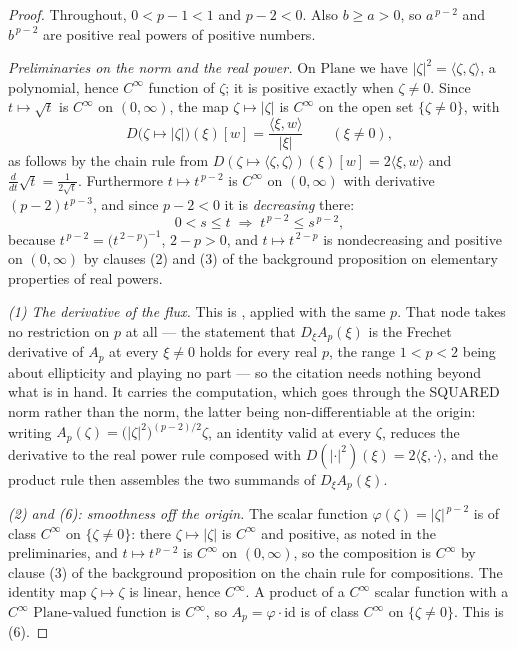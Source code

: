 \begin{proof}
Throughout, $0<p-1<1$ and $p-2<0$.  Also $b\ge a>0$, so $a^{\,p-2}$ and $b^{\,p-2}$ are
positive real powers of positive numbers.

\medskip\noindent\emph{Preliminaries on the norm and the real power.}
On $\mathrm{Plane}$ we have $\lvert\zeta\rvert^{2}=\langle\zeta,\zeta\rangle$, a polynomial,
hence $C^{\infty}$ function of $\zeta$; it is positive exactly when $\zeta\ne0$.  Since
$t\mapsto\sqrt{t}$ is $C^{\infty}$ on $(0,\infty)$, the map $\zeta\mapsto\lvert\zeta\rvert$ is
$C^{\infty}$ on the open set $\{\zeta\ne0\}$, with
\[
  D\bigl(\zeta\mapsto\lvert\zeta\rvert\bigr)(\xi)[w]
  =\frac{\langle\xi,w\rangle}{\lvert\xi\rvert}\qquad(\xi\ne0),
\]
as follows by the chain rule from $D(\zeta\mapsto\langle\zeta,\zeta\rangle)(\xi)[w]
=2\langle\xi,w\rangle$ and $\frac{d}{dt}\sqrt{t}=\frac{1}{2\sqrt t}$.  Furthermore
$t\mapsto t^{\,p-2}$ is $C^{\infty}$ on $(0,\infty)$ with derivative $(p-2)t^{\,p-3}$, and
since $p-2<0$ it is \emph{decreasing} there:
\begin{equation}\label{eq:fje-mono}
  0<s\le t\;\Longrightarrow\;t^{\,p-2}\le s^{\,p-2},
\end{equation}
because $t^{\,p-2}=\bigl(t^{\,2-p}\bigr)^{-1}$, $2-p>0$, and $t\mapsto t^{\,2-p}$ is
nondecreasing and positive on $(0,\infty)$ by clauses (2) and (3) of the background
proposition on elementary properties of real powers.

\medskip\noindent\emph{(1) The derivative of the flux.}
This is , applied with the same $p$.  That node takes no
restriction on $p$ at all --- the statement that $D_\xi A_p(\xi)$ is the Frechet derivative of
$A_p$ at every $\xi\ne0$ holds for every real $p$, the range $1<p<2$ being about ellipticity
and playing no part --- so the citation needs nothing beyond what is in hand.  It carries the
computation, which goes through the SQUARED norm rather than the norm, the latter being
non-differentiable at the origin: writing
$A_p(\zeta)=\bigl(\lvert\zeta\rvert^{2}\bigr)^{(p-2)/2}\zeta$, an identity valid at every
$\zeta$, reduces the derivative to the real power rule composed with
$D(\lvert\cdot\rvert^{2})(\xi)=2\langle\xi,\cdot\rangle$, and the product rule then assembles
the two summands of $D_\xi A_p(\xi)$.

\medskip\noindent\emph{(2) and (6): smoothness off the origin.}
The scalar function $\varphi(\zeta)=\lvert\zeta\rvert^{\,p-2}$ is of class $C^{\infty}$ on
$\{\zeta\ne0\}$: there $\zeta\mapsto\lvert\zeta\rvert$ is $C^{\infty}$ and positive, as noted
in the preliminaries, and $t\mapsto t^{\,p-2}$ is $C^{\infty}$ on $(0,\infty)$, so the
composition is $C^{\infty}$ by clause (3) of the background proposition on the chain rule for
compositions.  The identity map $\zeta\mapsto\zeta$ is linear, hence $C^{\infty}$.  A product
of a $C^{\infty}$ scalar function with a $C^{\infty}$ $\mathrm{Plane}$-valued function is
$C^{\infty}$, so $A_p=\varphi\cdot\mathrm{id}$ is of class $C^{\infty}$ on $\{\zeta\ne0\}$.
This is (6).


\end{proof}
